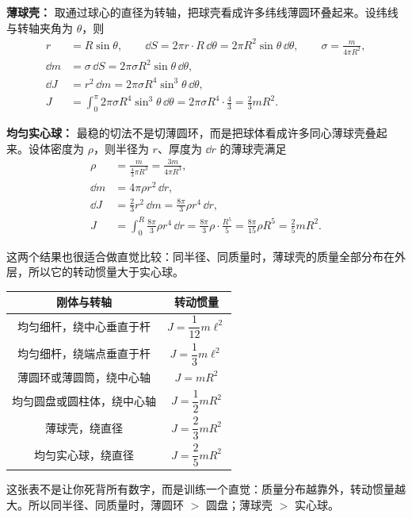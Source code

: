 \documentclass[lang=cn,11pt]{elegantbook}
\begin{document}
\begin{solution}
\textbf{薄球壳：} 取通过球心的直径为转轴，把球壳看成许多纬线薄圆环叠起来。设纬线与转轴夹角为 \(\theta\)，则
\begin{align*}
r&=R\sin\theta,\qquad
\dd S=2\pi r\cdot R\,\dd\theta=2\pi R^2\sin\theta\,\dd\theta,\qquad
\sigma=\frac{m}{4\pi R^2},\\
\dd m&=\sigma\,\dd S=2\pi\sigma R^2\sin\theta\,\dd\theta,\\
\dd J&=r^2\,\dd m=2\pi\sigma R^4\sin^3\theta\,\dd\theta,\\
J&=\int_0^\pi 2\pi\sigma R^4\sin^3\theta\,\dd\theta
=2\pi\sigma R^4\cdot \frac{4}{3}
=\frac{2}{3}mR^2.
\end{align*}

\textbf{均匀实心球：} 最稳的切法不是切薄圆环，而是把球体看成许多同心薄球壳叠起来。设体密度为 \(\rho\)，则半径为 \(r\)、厚度为 \(\dd r\) 的薄球壳满足
\begin{align*}
\rho&=\frac{m}{\frac43\pi R^3}=\frac{3m}{4\pi R^3},\\
\dd m&=4\pi\rho r^2\,\dd r,\\
\dd J&=\frac23 r^2\,\dd m=\frac{8\pi}{3}\rho r^4\,\dd r,\\
J&=\int_0^R \frac{8\pi}{3}\rho r^4\,\dd r
=\frac{8\pi}{3}\rho\cdot \frac{R^5}{5}
=\frac{8\pi}{15}\rho R^5
=\frac25 mR^2.
\end{align*}

这两个结果也很适合做直觉比较：同半径、同质量时，薄球壳的质量全部分布在外层，所以它的转动惯量大于实心球。
\end{solution}

\begin{center}
\begin{tabular}{c|c}
刚体与转轴 & 转动惯量 \\
\hline
均匀细杆，绕中心垂直于杆 & \(J=\dfrac{1}{12}m\ell^2\) \\
均匀细杆，绕端点垂直于杆 & \(J=\dfrac{1}{3}m\ell^2\) \\
薄圆环或薄圆筒，绕中心轴 & \(J=mR^2\) \\
均匀圆盘或圆柱体，绕中心轴 & \(J=\dfrac12 mR^2\) \\
薄球壳，绕直径 & \(J=\dfrac23 mR^2\) \\
均匀实心球，绕直径 & \(J=\dfrac25 mR^2\)
\end{tabular}
\end{center}

\begin{remark}
这张表不是让你死背所有数字，而是训练一个直觉：质量分布越靠外，转动惯量越大。所以同半径、同质量时，薄圆环 \(>\) 圆盘；薄球壳 \(>\) 实心球。
\end{remark}
\end{document}
